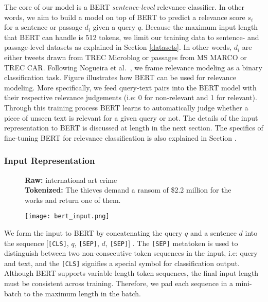 The core of our model is a BERT {\it sentence-level} relevance classifier.
In other words, we aim to build a model on top of BERT to predict a relevance score $ s_i $ for a sentence or passage $ d_i $ given a query $ q $.
Because the maximum input length that BERT can handle is 512 tokens, we limit our training data to sentence- and passage-level datasets as explained in Section \ref{datasets}.
In other words, $ d_i $ are either tweets drawn from TREC Microblog or passages from MS MARCO or TREC CAR.
Following Nogueira et al.~\cite{nogueira2019passage}, we frame relevance modeling as a binary classification task.
Figure  illustrates how BERT can be used for relevance modeling.
More specifically, we feed query-text pairs into the BERT model with their respective relevance judgements (i.e: 0 for non-relevant and 1 for relevant).
Through this training process BERT learns to automatically judge whether a piece of unseen text is relevant for a given query or not.
The details of the input representation to BERT is discussed at length in the next section.
The specifics of fine-tuning BERT for relevance classification is also explained in Section .

\subsubsection{Input Representation}

\begin{figure}[t!]
	\begin{framed}
		\centering
    		\textbf{Raw:} international art crime \\
    		\textbf{Tokenized:} The thieves demand a ransom of \$2.2 million for the works and return one of them.
	\end{framed}
\label{bert-tokenization-example}
 \caption{}
\end{figure}

\begin{figure}[b!]
\centering
  \texttt{[image: bert\_input.png]}
\caption{}
\label{fig:bert_input}
\end{figure}

We form the input to BERT by concatenating the query $ q $ and a sentence $ d $ into the sequence [\texttt{[CLS]}, $q$, \texttt{[SEP]}, $d$, \texttt{[SEP]}] .
The \texttt{[SEP]} metatoken is used to distinguish between two non-consecutive token sequences in the input, i.e: query and text, and the \texttt{[CLS]} signifies a special symbol for classification output.
Although BERT supports variable length token sequences, the final input length must be consistent across training.
Therefore, we pad each sequence in a mini-batch to the maximum length in the batch.

